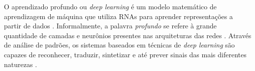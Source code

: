 O aprendizado profundo ou \emph{deep learning} é um modelo matemático de aprendizagem de máquina que utiliza RNAs para aprender representações a partir de dados \cite{ref:chollet, ref:buduma}. Informalmente, a palavra \emph{profundo} se refere à grande quantidade de camadas e neurônios presentes nas arquiteturas das redes \cite{ref:gulli}. Através de análise de padrões, os sistemas baseados em técnicas de \emph{deep learning} são capazes de reconhecer, traduzir, sintetizar e até prever sinais das mais diferentes naturezas \cite{ref:JAI-2017}.